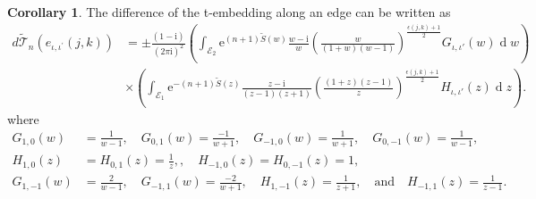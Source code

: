 \documentclass[12pt]{amsart}
\newcommand{\cT}{\mathcal T}
\newcommand{\io}{{\iota}}
\newcommand{\tS}{{\widetilde S}}
\numberwithin{equation}{section}
\theoremstyle{definition}
\newtheorem{cor}[thm]{Corollary}
\begin{document}
\begin{cor}
The difference of the t-embedding along an edge can be written as
\begin{equation}
    \label{eq:dT equation factor}
     \begin{aligned}
         d \widetilde{\mathcal{\cT}}_n\left(e_{\iota, \iota^{\prime}}(j, k)\right)&= \pm \frac{(1-\mathrm i)}{(2 \pi \mathrm{i})^2} \left(\int_{\mathcal{E}_2}\mathrm e^{(n+1)\tS(w)}\frac{w-\mathrm i}{w}\left (\frac{w}{(1+w)(w-1)}\right )^{\frac{\epsilon(j,k)+1}{2}} G_{\io,\io'}(w)\operatorname{d}w\right)\\
         &\times \left(\int_{\mathcal{E}_1} \mathrm{e}^{-(n+1)\tS(z)}\frac{z-\mathrm i}{(z-1)(z+1)}\left(\frac{(1+z)(z-1)}{z}\right)^{\frac{\epsilon(j,k)+1}{2}}H_{\io,\io'}(z)  \operatorname{d}z\right).
    \end{aligned} 
\end{equation}
where
$$
\begin{aligned}
G_{1,0}(w)&=\frac{1}{w-1}, \quad G_{0,1}(w) =\frac{-1}{w+1},
\quad G_{-1,0}(w)=\frac{1}{w+1}, \quad G_{0,-1}(w)=\frac{1}{w-1},\\
H_{1,0}(z)&= H_{0,1}(z)=\frac{1}{z},
, \quad H_{-1,0}(z)=H_{0,-1}(z)=1, \\
{
G_{1,-1}(w)} &= \frac{2}{w-1}, \quad G_{-1,1}(w)=\frac{-2}{w+1},\quad H_{1,-1}(z) = \frac{1}{z+1}, \quad \text{and} \quad H_{-1,1}(z) = \frac{1}{z-1}.
\end{aligned}
$$
\end{cor}
\end{document}
